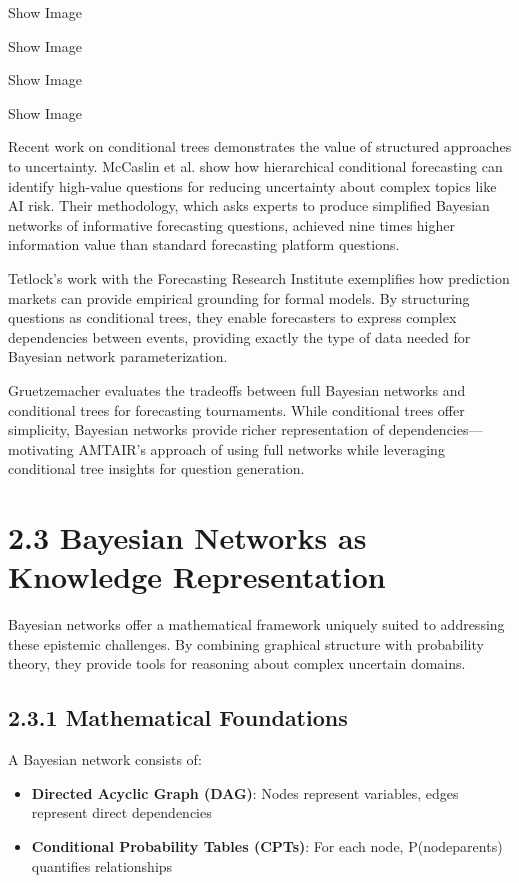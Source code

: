 \documentclass[
  11pt,
  letterpaper,
]{book}
\providecommand{\tightlist}{%
  \setlength{\itemsep}{0pt}\setlength{\parskip}{0pt}}
\begin{document}
Show Image

Show Image

Show Image

Show Image

Recent work on conditional trees demonstrates the value of structured
approaches to uncertainty. McCaslin et al. \textcite{mccaslin2024} show
how hierarchical conditional forecasting can identify high-value
questions for reducing uncertainty about complex topics like AI risk.
Their methodology, which asks experts to produce simplified Bayesian
networks of informative forecasting questions, achieved nine times
higher information value than standard forecasting platform questions.

Tetlock's work with the Forecasting Research Institute
\textcite{tetlock2022} exemplifies how prediction markets can provide
empirical grounding for formal models. By structuring questions as
conditional trees, they enable forecasters to express complex
dependencies between events, providing exactly the type of data needed
for Bayesian network parameterization.

Gruetzemacher \textcite{gruetzemacher2022} evaluates the tradeoffs
between full Bayesian networks and conditional trees for forecasting
tournaments. While conditional trees offer simplicity, Bayesian networks
provide richer representation of dependencies---motivating AMTAIR's
approach of using full networks while leveraging conditional tree
insights for question generation.

\section{2.3 Bayesian Networks as Knowledge
Representation}\label{bayesian-networks-as-knowledge-representation}

Bayesian networks offer a mathematical framework uniquely suited to
addressing these epistemic challenges. By combining graphical structure
with probability theory, they provide tools for reasoning about complex
uncertain domains.

\subsection{2.3.1 Mathematical
Foundations}\label{mathematical-foundations}

A Bayesian network consists of:

\begin{itemize}
\tightlist
\item
  \textbf{Directed Acyclic Graph (DAG)}: Nodes represent variables,
  edges represent direct dependencies
\item
  \textbf{Conditional Probability Tables (CPTs)}: For each node,
  P(node\textbar parents) quantifies relationships
\end{itemize}
\end{document}
